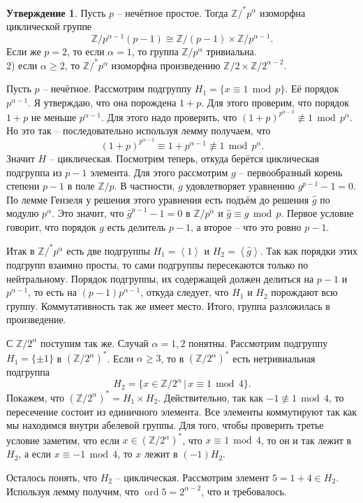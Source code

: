 \documentclass[10pt,a4paper,oneside]{book}
\theoremstyle{definition}
\newtheorem{utvr}{\color{blue!50!black}Утверждение}
\renewcommand{\geq}{\geqslant}
\renewcommand{\mod}{\,\operatorname{mod}\,}
\newcommand{\mb}[1]{\mathbb{#1}}
\newcommand{\ord}{\operatorname{ord}}
\def\lan{\left\langle }
\def\ran{\right\rangle}
\def\utv{\begin{utvr}}
\def\eutv{\end{utvr}}
\begin{document}
\utv Пусть  $p$ -- нечётное простое. Тогда $\mb Z/^*p^{\alpha}$ изоморфна циклической группе 
$$\mb Z/p^{\alpha-1} (p-1) \cong \mb Z/(p - 1) \times \mb Z/p^{\alpha-1}.$$
Если же $p=2$, то если $\alpha = 1$, то группа $\mb Z/p^{\alpha}$ тривиальна.\\
2) если $\alpha \geq 2$, то $\mb Z/^*p^{\alpha}$ изоморфна произведению $ \mb Z/2 \times \mb Z/2^{\alpha-2}$.
\eutv
\proof
Пусть $p$ -- нечётное. Рассмотрим подгруппу $H_1=\{ x\equiv 1 \mod p\}$. Её порядок $p^{\alpha -1}$. Я утверждаю, что она порождена $1+p$. Для этого проверим, что порядок $1+p$ не меньше $p^{\alpha-1}$. Для этого надо проверить, что $(1+p)^{p^{\alpha-2}} \not\equiv 1 \mod p^{\alpha}$. Но это так -- последовательно используя лемму получаем, что
$$(1+p)^{p^{\alpha-2}}\equiv 1+p^{\alpha-1}\not\equiv 1 \mod p^{\alpha}.$$
Значит $H$ -- циклическая. Посмотрим теперь, откуда берётся циклическая подгруппа из $p-1$ элемента. Для этого рассмотрим $g$ -- первообразный корень степени $p-1$ в поле $\mb Z/p$. В частности, $g$ удовлетворяет уравнению $g^{p-1}-1=0$. По лемме Гензеля у решения этого уравнения есть подъём до решения $\hat{g}$ по модулю $p^{\alpha}$. Это значит, что $\hat{g}^{p-1}-1=0$ в $\mb Z/p^{\alpha}$ и $\hat{g}\equiv g \mod p$. Первое условие говорит, что порядок $g$ есть делитель $p-1$, а второе -- что это ровно $p-1$.

Итак в $\mb Z/^*p^{\alpha}$ есть две подгруппы $H_1=\lan 1\ran$ и $H_2=\lan \hat{g} \ran$. Так как порядки этих подгрупп взаимно просты, то сами подгруппы пересекаются только по нейтральному. Порядок подгруппы, их содержащей  должен делиться на $p-1$ и $p^{\alpha-1}$, то есть на $(p-1)p^{\alpha-1}$, откуда следует, что $H_1$ и $H_2$ порождают всю группу. Коммутативность так же имеет место. Итого, группа разложилась в произведение.

С $\mb Z/2^{\alpha}$ поступим так же. Случай $\alpha=1,2$ понятны. Рассмотрим подгруппу $H_1=\{\pm 1\}$ в $(\mb Z/2^\alpha)^*$. Если $\alpha\geq 3$, то в $(\mb Z/2^\alpha)^*$ есть нетривиальная подгруппа 
$$H_2=\{ x\in \mb Z/2^\alpha\,|\, x \equiv 1 \mod 4\}.$$
Покажем, что $(\mb Z/2^\alpha)^* =H_1 \times H_2$. Действительно, так как $-1\not\equiv 1 \mod 4$, то пересечение состоит из единичного элемента. Все элементы коммутируют так как мы находимся внутри абелевой группы. Для того, чтобы проверить третье условие заметим, что если $x\in (\mb Z/2^\alpha)^*$, что $x\equiv 1\mod 4$, то он и так лежит в $H_2$, а если $x\equiv -1 \mod 4$, то $x$ лежит в $(-1)H_2$.

Осталось понять, что $H_2$ -- циклическая. Рассмотрим элемент $5=1+4\in H_2$. Используя лемму получим, что $\ord 5 = 2^{\alpha-2}$, что и требовалось. 
\end{document}
